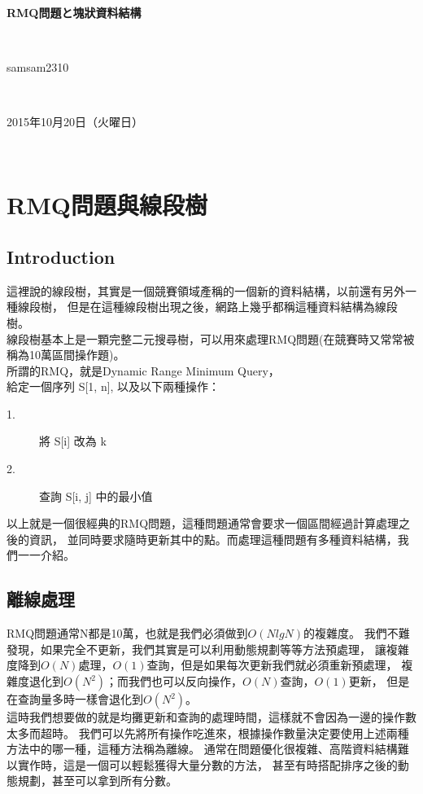 \documentclass{article}
\title{\hmwkClass}
\author{\hmwkAuthorName}
\date{\hmwkDueDate}
\def\normalsize{\fontsize{12}{16}\selectfont}
\def\large{\fontsize{16}{24}\selectfont}
\def\LARGE{\fontsize{24}{36}\selectfont}
\newcommand{\hmwkDueDate}{2015年10月20日（火曜日）} %
\newcommand{\hmwkClass}{RMQ問題と塊狀資料結構} %
\newcommand{\hmwkAuthorName}{samsam2310} %
\begin{document}
\LARGE~\\[4ex]
\centerline{\bf\hmwkClass}\large\\[2ex]\centerline{\hmwkAuthorName}\\[2ex]\centerline{\hmwkDueDate}\\
\normalsize


\section{RMQ問題與線段樹}
\subsection*{Introduction}
這裡說的線段樹，其實是一個競賽領域產稱的一個新的資料結構，以前還有另外一種線段樹，
但是在這種線段樹出現之後，網路上幾乎都稱這種資料結構為線段樹。\\
線段樹基本上是一顆完整二元搜尋樹，可以用來處理RMQ問題(在競賽時又常常被稱為10萬區間操作題)。\\
所謂的RMQ，就是Dynamic Range Minimum Query，\\
給定一個序列 S[1, n], 以及以下兩種操作：\\
\begin{description}
\item[ 1.]將 S[i] 改為 k
\item[ 2.]查詢 S[i, j] 中的最小值
\end{description}
以上就是一個很經典的RMQ問題，這種問題通常會要求一個區間經過計算處理之後的資訊，
並同時要求隨時更新其中的點。而處理這種問題有多種資料結構，我們一一介紹。


\subsection{離線處理}
RMQ問題通常N都是10萬，也就是我們必須做到$O(N lg N)$的複雜度。
我們不難發現，如果完全不更新，我們其實是可以利用動態規劃等等方法預處理，
讓複雜度降到$O(N)$處理，$O(1)$查詢，但是如果每次更新我們就必須重新預處理，
複雜度退化到$O(N^2)$；而我們也可以反向操作，$O(N)$查詢，$O(1)$更新，
但是在查詢量多時一樣會退化到$O(N^2)$。\\
這時我們想要做的就是均攤更新和查詢的處理時間，這樣就不會因為一邊的操作數太多而超時。
我們可以先將所有操作吃進來，根據操作數量決定要使用上述兩種方法中的哪一種，這種方法稱為離線。
通常在問題優化很複雜、高階資料結構難以實作時，這是一個可以輕鬆獲得大量分數的方法，
甚至有時搭配排序之後的動態規劃，甚至可以拿到所有分數。
\end{document}
